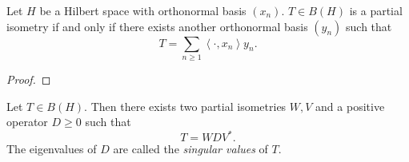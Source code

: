 \begin{proposition}
	\label{prop:MatrixPartialIsometry}
	Let $H$ be a Hilbert space with orthonormal basis $(x_n)$. $T \in B(H)$ is a partial isometry if and only if there exists another orthonormal basis $ (y_n)$ such that
	\[
		T = \sum_{n \ge 1} \left\langle \cdot , x_n \right\rangle y_n
	.\] 
\end{proposition}
\begin{proof}
\end{proof}


\begin{theorem}
	\label{thm:SingularValueDecomposition}
	Let $T \in B(H)$. Then there exists two partial isometries $W, V$ and a positive operator $D \ge 0$ such that
	\[
		T = W D V^*
	.\] 
	The eigenvalues of $D$ are called the \textit{singular values} of $T$.
\end{theorem}





